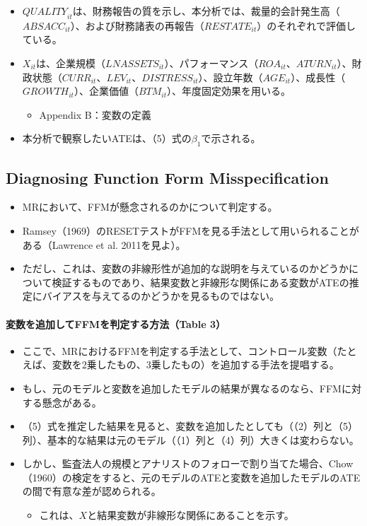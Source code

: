 \begin{itemize}
 \item $\mathit{QUALITY}_{it}$は、財務報告の質を示し、本分析では、裁量的会計発生高（$\mathit{ABSACC}_{it}$）、および財務諸表の再報告（$\mathit{RESTATE}_{it}$）のそれぞれで評価している。
 \item $X_{it}$は、企業規模（$\mathit{LNASSETS}_{it}$）、パフォーマンス（$\mathit{ROA}_{it}$、$\mathit{ATURN}_{it}$）、財政状態（$\mathit{CURR}_{it}$、$\mathit{LEV}_{it}$、$\mathit{DISTRESS}_{it}$）、設立年数（$\mathit{AGE}_{it}$）、成長性（$\mathit{GROWTH}_{it}$）、企業価値（$\mathit{BTM}_{it}$）、年度固定効果を用いる。
  \begin{itemize}
   \item Appendix B：変数の定義
  \end{itemize}
 \item 本分析で観察したいATEは、（5）式の$\beta_1$で示される。
\end{itemize}

\subsection*{Diagnosing Function Form Misspecification}
\begin{itemize}
 \item MRにおいて、FFMが懸念されるのかについて判定する。
 \item Ramsey（1969）のRESETテストがFFMを見る手法として用いられることがある（Lawrence et al. 2011を見よ）。
 \item ただし、これは、変数の非線形性が追加的な説明を与えているのかどうかについて検証するものであり、結果変数と非線形な関係にある変数がATEの推定にバイアスを与えてるのかどうかを見るものではない。
\end{itemize}

\paragraph{変数を追加してFFMを判定する方法（Table 3）}

\begin{itemize}
 \item ここで、MRにおけるFFMを判定する手法として、コントロール変数（たとえば、変数を2乗したもの、3乗したもの）を追加する手法を提唱する。
 \item もし、元のモデルと変数を追加したモデルの結果が異なるのなら、FFMに対する懸念がある。
 \item （5）式を推定した結果を見ると、変数を追加したとしても（（2）列と（5）列）、基本的な結果は元のモデル（（1）列と（4）列）大きくは変わらない。
 \item しかし、監査法人の規模とアナリストのフォローで割り当てた場合、Chow（1960）の検定をすると、元のモデルのATEと変数を追加したモデルのATEの間で有意な差が認められる。
  \begin{itemize}
   \item これは、$X$と結果変数が非線形な関係にあることを示す。
  \end{itemize}
\end{itemize}

